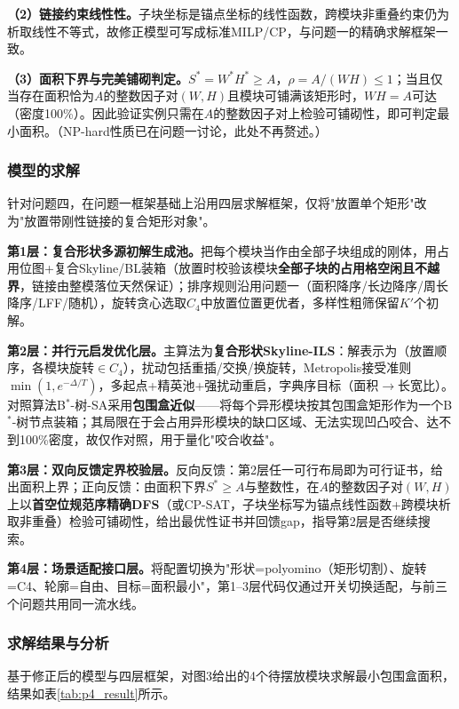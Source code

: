 \documentclass{JXUSTmodeling}
\begin{document}
\textbf{（2）链接约束线性性。}子块坐标是锚点坐标的线性函数，跨模块非重叠约束仍为析取线性不等式，故修正模型可写成标准MILP/CP，与问题一的精确求解框架一致。

\textbf{（3）面积下界与完美铺砌判定。}$S^*=W^*H^*\ge A$，$\rho=A/(WH)\le1$；当且仅当存在面积恰为$A$的整数因子对$(W,H)$且模块可铺满该矩形时，$WH=A$可达（密度100\%）。因此验证实例只需在$A$的整数因子对上检验可铺砌性，即可判定最小面积。（NP-hard性质已在问题一讨论，此处不再赘述。）

\subsubsection{模型的求解}
针对问题四，在问题一框架基础上沿用四层求解框架，仅将"放置单个矩形"改为"放置带刚性链接的复合矩形对象"。

\textbf{第1层：复合形状多源初解生成池。}把每个模块当作由全部子块组成的刚体，用占用位图+复合Skyline/BL装箱（放置时校验该模块\textbf{全部子块的占用格空闲且不越界}，链接由整模落位天然保证）；排序规则沿用问题一（面积降序/长边降序/周长降序/LFF/随机），旋转贪心选取$C_4$中放置位置更优者，多样性粗筛保留$K'$个初解。

\textbf{第2层：并行元启发优化层。}主算法为\textbf{复合形状Skyline-ILS}：解表示为（放置顺序，各模块旋转$\in C_4$），扰动包括重插/交换/换旋转，Metropolis接受准则$\min(1,e^{-\Delta/T})$，多起点+精英池+强扰动重启，字典序目标（面积$\to$长宽比）。对照算法B${}^{\ast}$-树-SA采用\textbf{包围盒近似}——将每个异形模块按其包围盒矩形作为一个B${}^{\ast}$-树节点装箱；其局限在于会占用异形模块的缺口区域、无法实现凹凸咬合、达不到100\%密度，故仅作对照，用于量化"咬合收益"。

\textbf{第3层：双向反馈定界校验层。}反向反馈：第2层任一可行布局即为可行证书，给出面积上界；正向反馈：由面积下界$S^*\ge A$与整数性，在$A$的整数因子对$(W,H)$上以\textbf{首空位规范序精确DFS}（或CP-SAT，子块坐标写为锚点线性函数+跨模块析取非重叠）检验可铺砌性，给出最优性证书并回馈gap，指导第2层是否继续搜索。

\textbf{第4层：场景适配接口层。}将配置切换为"形状=polyomino（矩形切割）、旋转=C4、轮廓=自由、目标=面积最小"，第1--3层代码仅通过开关切换适配，与前三个问题共用同一流水线。

\subsubsection{求解结果与分析}
基于修正后的模型与四层框架，对图3给出的4个待摆放模块求解最小包围盒面积，结果如表\ref{tab:p4_result}所示。
\end{document}
